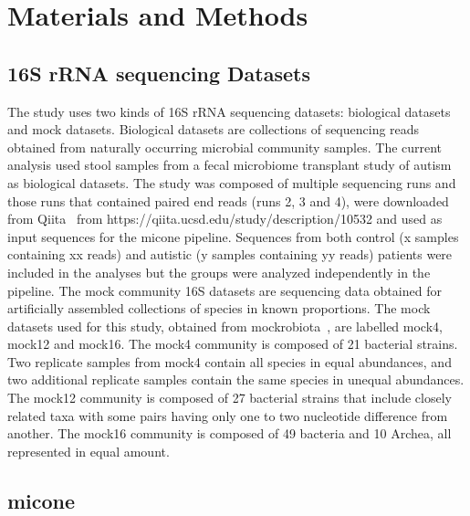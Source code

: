 
\section*{Materials and Methods}

  \subsection*{16S rRNA sequencing Datasets}

  \vspace{-5mm}
    The study uses two kinds of 16S rRNA sequencing datasets: biological datasets and mock datasets.
    Biological datasets are collections of sequencing reads obtained from naturally occurring microbial community samples.
    The current analysis used stool samples from a fecal microbiome transplant study of autism~\cite{Kang2017} as biological datasets.
    The study was composed of multiple sequencing runs and those runs that contained paired end reads (runs 2, 3 and 4), were downloaded from Qiita~\cite{qiita} from https://qiita.ucsd.edu/study/description/10532 and used as input sequences for the \ac{micone} pipeline.
    Sequences from both control (x samples containing xx reads) and autistic (y samples containing yy reads) patients were included in the analyses but the groups were analyzed independently in the pipeline.
    The mock community 16S datasets are sequencing data obtained for artificially assembled collections of species in known proportions.
    The mock datasets used for this study, obtained from mockrobiota~\cite{Bokulich2016}, are labelled mock4, mock12 and mock16.
    The mock4 community is composed of 21 bacterial strains.
    Two replicate samples from mock4 contain all species in equal abundances, and two additional replicate samples contain the same species in unequal abundances.
    The mock12 community is composed of 27 bacterial strains that include closely related taxa with some pairs having only one to two nucleotide difference from another.
    The mock16 community is composed of 49 bacteria and 10 Archea, all represented in equal amount.

  \subsection*{\ac{micone}}

